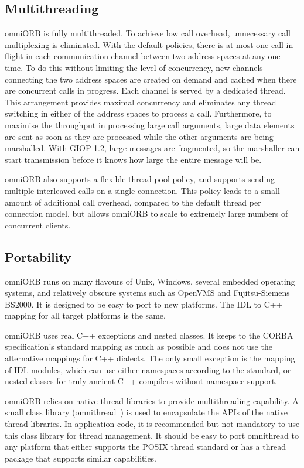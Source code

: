 \documentclass[11pt,oneside,a4paper]{book}
\begin{document}
\subsection{Multithreading}

omniORB is fully multithreaded. To achieve low call overhead,
unnecessary call multiplexing is eliminated. With the default
policies, there is at most one call in-flight in each communication
channel between two address spaces at any one time. To do this without
limiting the level of concurrency, new channels connecting the two
address spaces are created on demand and cached when there are
concurrent calls in progress. Each channel is served by a dedicated
thread. This arrangement provides maximal concurrency and eliminates
any thread switching in either of the address spaces to process a
call. Furthermore, to maximise the throughput in processing large call
arguments, large data elements are sent as soon as they are processed
while the other arguments are being marshalled. With GIOP 1.2, large
messages are fragmented, so the marshaller can start transmission
before it knows how large the entire message will be.

omniORB also supports a flexible thread pool policy, and supports
sending multiple interleaved calls on a single connection. This policy
leads to a small amount of additional call overhead, compared to the
default thread per connection model, but allows omniORB to scale to
extremely large numbers of concurrent clients.


\subsection{Portability}

omniORB runs on many flavours of Unix, Windows, several embedded
operating systems, and relatively obscure systems such as OpenVMS and
Fujitsu-Siemens BS2000.  It is designed to be easy to port to new
platforms. The IDL to C++ mapping for all target platforms is the
same.

omniORB uses real C++ exceptions and nested classes. It keeps to the
CORBA specification's standard mapping as much as possible and does
not use the alternative mappings for C++ dialects. The only small
exception is the mapping of IDL modules, which can use either
namespaces according to the standard, or nested classes for truly
ancient C++ compilers without namespace support.

omniORB relies on native thread libraries to provide multithreading
capability. A small class library (omnithread~\cite{tjr96a}) is used
to encapsulate the APIs of the native thread libraries. In application
code, it is recommended but not mandatory to use this class library
for thread management. It should be easy to port omnithread to any
platform that either supports the POSIX thread standard or has a
thread package that supports similar capabilities.
\end{document}
